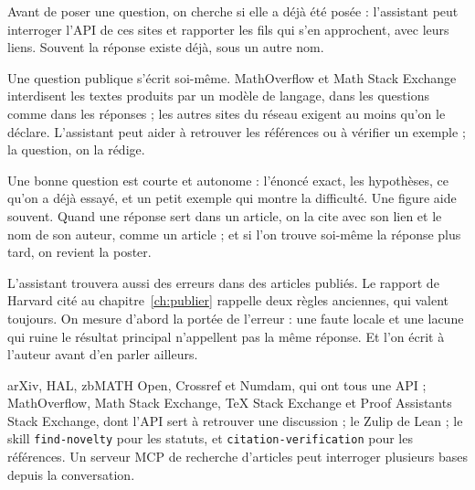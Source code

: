 Avant de poser une question, on cherche si elle a déjà été posée : l'assistant peut
interroger l'API de ces sites et rapporter les fils qui s'en approchent, avec leurs liens.
Souvent la réponse existe déjà, sous un autre nom.

\begin{regle}
Une question publique s'écrit soi-même. MathOverflow et Math Stack Exchange interdisent
les textes produits par un modèle de langage, dans les questions comme dans les réponses ;
les autres sites du réseau exigent au moins qu'on le déclare. L'assistant peut aider à retrouver les références ou à vérifier
un exemple ; la question, on la rédige.
\end{regle}

Une bonne question est courte et autonome : l'énoncé exact, les hypothèses, ce qu'on a
déjà essayé, et un petit exemple qui montre la difficulté. Une figure aide souvent. Quand
une réponse sert dans un article, on la cite avec son lien et le nom de son auteur, comme
un article ; et si l'on trouve soi-même la réponse plus tard, on revient la poster.

L'assistant trouvera aussi des erreurs dans des articles publiés. Le rapport de Harvard cité
au chapitre~\ref{ch:publier} rappelle deux règles anciennes, qui valent toujours. On mesure
d'abord la portée de l'erreur : une faute locale et une lacune qui ruine le résultat
principal n'appellent pas la même réponse. Et l'on écrit à l'auteur avant d'en parler
ailleurs.

\begin{outils}
arXiv, HAL, zbMATH Open, Crossref et Numdam, qui ont tous une API ; MathOverflow,
Math Stack Exchange, TeX Stack Exchange et Proof Assistants Stack Exchange, dont l'API sert à retrouver une discussion ; le Zulip de Lean ; le skill
\texttt{find-novelty} pour les statuts, et \texttt{citation-verification} pour les
références. Un serveur MCP de recherche d'articles peut interroger plusieurs bases depuis la
conversation.
\end{outils}
